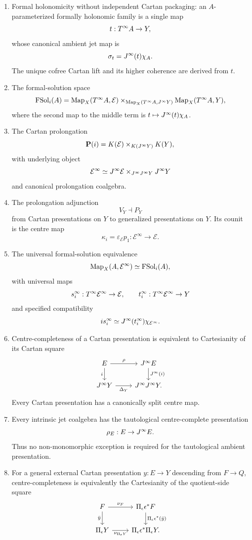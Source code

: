 \begin{theorem}
\begin{enumerate}
\item Formal holonomicity without independent Cartan packaging: an $A$-parameterized formally holonomic family is a single map
\[
    t:T^{\infty} A\to Y,
\]
whose canonical ambient jet map is
\[
    \sigma_t=J^{\infty}(t)\chi_A.
\]
The unique cofree Cartan lift and its higher coherence are derived from $t$.

\item The formal-solution space
\[
\operatorname{FSol}_i(A)
=
\operatorname{Map}_X(T^{\infty} A,\mathcal E)
\times_{\operatorname{Map}_X(T^{\infty} A,J^{\infty} Y)}
\operatorname{Map}_X(T^{\infty} A,Y),
\]
where the second map to the middle term is $t\mapsto J^{\infty}(t)\chi_A$.

\item The Cartan prolongation
\[
    \mathbf P(i)
    =
    K(\mathcal E)\times_{K(J^{\infty} Y)}K(Y),
\]
with underlying object
\[
    \mathcal E^\infty
    \simeq
    J^{\infty}\mathcal E\times_{J^{\infty}J^{\infty} Y}J^{\infty} Y
\]
and canonical prolongation coalgebra.

\item The prolongation adjunction
\[
    V_Y\dashv P_Y
\]
from Cartan presentations on $Y$ to generalized presentations on $Y$.  Its counit is the centre map
\[
    \kappa_i=\varepsilon_{\mathcal E}p_1:\mathcal E^\infty\to\mathcal E.
\]

\item The universal formal-solution equivalence
\[
    \operatorname{Map}_X(A,\mathcal E^\infty)
    \simeq
    \operatorname{FSol}_i(A),
\]
with universal maps
\[
    s_i^\infty:T^{\infty}\mathcal E^\infty\to\mathcal E,
    \qquad
    t_i^\infty:T^{\infty}\mathcal E^\infty\to Y
\]
and specified compatibility
\[
    is_i^\infty\simeq J^{\infty}(t_i^\infty)\chi_{\mathcal E^\infty}.
\]

\item Centre-completeness of a Cartan presentation is equivalent to Cartesianity of its Cartan square
\[
\begin{tikzcd}
E \arrow[r,"\rho"] \arrow[d,"i"']
& \Jinf E \arrow[d,"\Jinf(i)"]
\\
\Jinf Y \arrow[r,"\Delta_Y"']
& \Jinf\Jinf Y.
\end{tikzcd}
\]
Every Cartan presentation has a canonically split centre map.

\item Every intrinsic jet coalgebra has the tautological centre-complete presentation
\[
    \rho_E:E\to J^{\infty} E.
\]
Thus no non-monomorphic exception is required for the tautological ambient presentation.

\item For a general external Cartan presentation $y:E\to Y$ descending from $F\to Q$, centre-completeness is equivalently the Cartesianity of the quotient-side square
\[
\begin{tikzcd}
F \arrow[r,"\nu_F"] \arrow[d,"\bar y"']
& \Pi_\epsilon\epsilon^*F
  \arrow[d,"\Pi_\epsilon\epsilon^*(\bar y)"]
\\
\Pi_\epsilon Y \arrow[r,"\nu_{\Pi_\epsilon Y}"']
& \Pi_\epsilon\epsilon^*\Pi_\epsilon Y.
\end{tikzcd}
\]


\end{enumerate}
\end{theorem}
